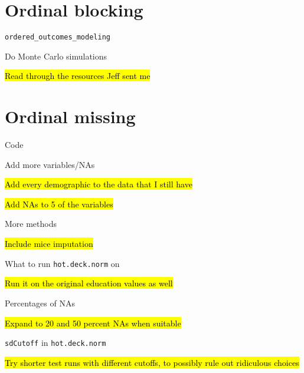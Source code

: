 \section*{Ordinal blocking}
	\begin{coi}
		\item \texttt{ordered\_outcomes\_modeling}
			\begin{coi}
				\item Do Monte Carlo simulations
					\begin{coi}
						\item \hl{Read through the resources Jeff sent me}
					\end{coi}
			\end{coi}
	\end{coi}
	
\section*{Ordinal missing}
	\begin{coi}
		\item Code
			\begin{coi}
				\item Add more variables/NAs
					\begin{coi}
						\item \hl{Add every demographic to the data that I still have}				
						\item \hl{Add NAs to 5 of the variables}
					\end{coi}
				\item More methods
					\begin{coi}
						\item \hl{Include mice imputation}
					\end{coi}
				\item What to run \texttt{hot.deck.norm} on
					\begin{coi}
						\item \hl{Run it on the original education values as well}
					\end{coi}
				\item Percentages of NAs
					\begin{coi}
						\item \hl{Expand to 20 and 50 percent NAs when suitable}
					\end{coi}
				\item \texttt{sdCutoff} in \texttt{hot.deck.norm}
					\begin{coi}
						\item \hl{Try shorter test runs with different cutoffs, to possibly rule out ridiculous choices}		
					\end{coi}
			\end{coi}
	\end{coi}


	


	




